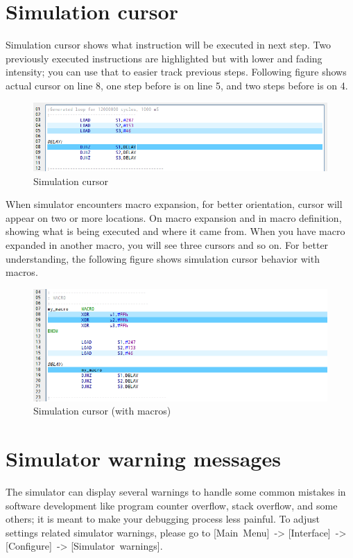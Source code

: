\section{Simulation cursor}
    Simulation cursor shows what instruction will be executed in next step. Two previously executed instructions are highlighted but with lower and fading intensity; you can use that to easier track previous steps. Following figure shows actual cursor on line 8, one step before is on line 5, and two steps before is on 4.

    \begin{figure}[h!]
        \centering
        \includegraphics[width=\textwidth]{img/simulationcursor1.png}
        \caption{Simulation cursor}
    \end{figure}

    \clearpage

    When simulator encounters macro expansion, for better orientation, cursor will appear on two or more locations. On macro expansion and in macro definition, showing what is being executed and where it came from. When you have macro expanded in another macro, you will see three cursors and so on. For better understanding, the following figure shows simulation cursor behavior with macros.

    \begin{figure}[h!]
        \centering
        \includegraphics[width=\textwidth]{img/simulationcursor2.png}
        \caption{Simulation cursor (with macros)}
    \end{figure}


\section{Simulator warning messages}
    The simulator can display several warnings to handle some common mistakes in software development like program counter overflow, stack overflow, and some others; it is meant to make your debugging process less painful. To adjust settings related simulator warnings, please go to [Main~Menu]~-> [Interface]~-> [Configure]~-> [Simulator~warnings].

